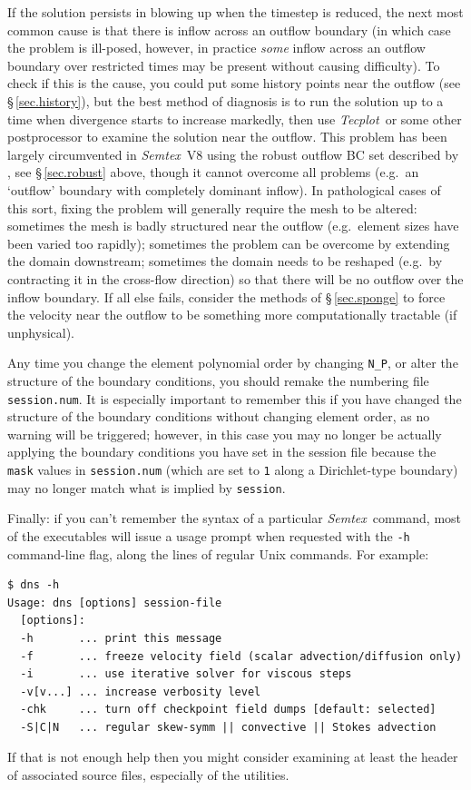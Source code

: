 \documentclass[11pt]{report}
\newcommand{\Semtex}{\emph{Semtex}} \newcommand{\Dog}{\emph{Dog}}
\newcommand{\Tecplot}{\emph{Tecplot}}
\newcommand{\eg}{e.g.\ } \newcommand{\CC}{\mathrm{c.c.}}
\begin{document}
If the solution persists in blowing up when the timestep is reduced,
the next most common cause is that there is inflow across an outflow
boundary (in which case the problem is ill-posed, however, in practice
\emph{some} inflow across an outflow boundary over restricted times
may be present without causing difficulty). To check if this is the
cause, you could put some history points near the outflow (see
\S\,\ref{sec.history}), but the best method of diagnosis is to run the
solution up to a time when divergence starts to increase markedly,
then use \Tecplot\ or some other postprocessor to examine the
solution near the outflow.  This problem has been largely circumvented
in \Semtex~V8 using the robust outflow BC set described by
\citet{dkc14}, see \S\,\ref{sec.robust} above, though it cannot
overcome all problems (\eg an `outflow' boundary with completely
dominant inflow).  In pathological cases of this sort, fixing the
problem will generally require the mesh to be altered: sometimes the
mesh is badly structured near the outflow (\eg element sizes have been
varied too rapidly); sometimes the problem can be overcome by
extending the domain downstream; sometimes the domain needs to be
reshaped (\eg by contracting it in the cross-flow direction) so that
there will be no outflow over the inflow boundary. If all else fails,
consider the methods of \S\,\ref{sec.sponge} to force the velocity
near the outflow to be something more computationally tractable (if
unphysical).

Any time you change the element polynomial order by changing
\verb+N_P+, or alter the structure of the boundary conditions, you
should remake the numbering file \verb+session.num+. It is especially
important to remember this if you have changed the structure of the
boundary conditions without changing element order, as no warning will
be triggered; however, in this case you may no longer be actually
applying the boundary conditions you have set in the session file
because the \verb+mask+ values in \texttt{session.num} (which are set
to \verb+1+ along a Dirichlet-type boundary) may no longer match what
is implied by \texttt{session}.

Finally: if you can't remember the syntax of a particular
\Semtex\ command, most of the executables will issue a usage prompt
when requested with the \verb|-h| command-line flag, along the lines
of regular Unix commands.  For example:
%
{\small
\begin{verbatim}
$ dns -h
Usage: dns [options] session-file
  [options]:
  -h       ... print this message
  -f       ... freeze velocity field (scalar advection/diffusion only)
  -i       ... use iterative solver for viscous steps
  -v[v...] ... increase verbosity level
  -chk     ... turn off checkpoint field dumps [default: selected]
  -S|C|N   ... regular skew-symm || convective || Stokes advection
\end{verbatim}
}
%
\noindent
If that is not enough help then you might consider examining at least
the header of associated source files, especially of the utilities.
\end{document}
